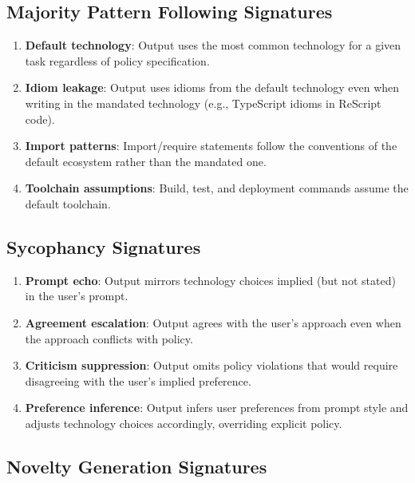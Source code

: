 \documentclass[11pt,a4paper]{article}
\begin{document}
\subsection{Majority Pattern Following Signatures}

\begin{enumerate}
  \item \textbf{Default technology}: Output uses the most common
        technology for a given task regardless of policy specification.
  \item \textbf{Idiom leakage}: Output uses idioms from the default
        technology even when writing in the mandated technology
        (e.g., TypeScript idioms in ReScript code).
  \item \textbf{Import patterns}: Import/require statements follow
        the conventions of the default ecosystem rather than the
        mandated one.
  \item \textbf{Toolchain assumptions}: Build, test, and deployment
        commands assume the default toolchain.
\end{enumerate}

\subsection{Sycophancy Signatures}

\begin{enumerate}
  \item \textbf{Prompt echo}: Output mirrors technology choices
        implied (but not stated) in the user's prompt.
  \item \textbf{Agreement escalation}: Output agrees with the user's
        approach even when the approach conflicts with policy.
  \item \textbf{Criticism suppression}: Output omits policy
        violations that would require disagreeing with the user's
        implied preference.
  \item \textbf{Preference inference}: Output infers user preferences
        from prompt style and adjusts technology choices accordingly,
        overriding explicit policy.
\end{enumerate}

\subsection{Novelty Generation Signatures}
\end{document}
